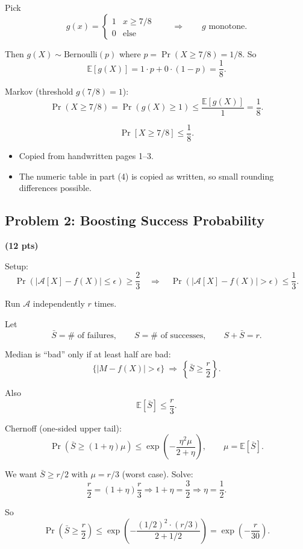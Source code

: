 \documentclass[10pt]{article}
\newcommand{\spara}[1]{\vspace{.5em}\noindent {\large\sffamily\textcolor{nyuOfficialPurple}{#1}}}
\newcommand{\E}{\mathbb{E}}
\begin{document}
\begin{enumerate}[label=\arabic*.]
Pick
\[
g(x)=
\begin{cases}
1 & x\ge 7/8\\
0 & \text{else}
\end{cases}
\qquad\Rightarrow\qquad
g \text{ monotone.}
\]

Then $g(X)\sim \text{Bernoulli}(p)$ where $p=\Pr(X\ge 7/8)=1/8$.
So
\[
\E[g(X)] = 1\cdot p + 0\cdot (1-p) = \frac{1}{8}.
\]

Markov (threshold $g(7/8)=1$):
\[
\Pr(X\ge 7/8)=\Pr(g(X)\ge 1)\le \frac{\E[g(X)]}{1}=\frac{1}{8}.
\]

\[
\boxed{\Pr[X\ge 7/8]\le \frac{1}{8}.}
\]

\spara{Notes for Problem 1}
\begin{itemize}
\item Copied from handwritten pages 1--3.
\item The numeric table in part (4) is copied as written, so small rounding differences possible.
\end{itemize}

\end{enumerate}



\subsection{Problem 2: Boosting Success Probability}
\textbf{(12 pts)}

\spara{Pr. 2}

Setup:
\[
\Pr(|\mathcal{A}[X]-f(X)|\le \epsilon)\ge \frac{2}{3}
\quad\Rightarrow\quad
\Pr(|\mathcal{A}[X]-f(X)|>\epsilon)\le \frac{1}{3}.
\]

Run $\mathcal{A}$ independently $r$ times.

Let
\[
\bar{S}=\#\text{ of failures},\qquad S=\#\text{ of successes},\qquad S+\bar{S}=r.
\]

Median is ``bad'' only if at least half are bad:
\[
\{|M-f(X)|>\epsilon\}\ \Rightarrow\ \left\{\bar{S}\ge \frac{r}{2}\right\}.
\]

Also
\[
\E[\bar{S}] \le \frac{r}{3}.
\]

Chernoff (one-sided upper tail):
\[
\Pr(\bar{S}\ge (1+\eta)\mu)\le \exp\!\left(-\frac{\eta^2\mu}{2+\eta}\right),
\qquad
\mu=\E[\bar{S}].
\]

We want $\bar{S}\ge r/2$ with $\mu=r/3$ (worst case). Solve:
\[
\frac{r}{2}=(1+\eta)\frac{r}{3}
\Rightarrow
1+\eta=\frac{3}{2}
\Rightarrow
\eta=\frac{1}{2}.
\]

So
\[
\Pr\!\left(\bar{S}\ge \frac{r}{2}\right)
\le
\exp\!\left(-\frac{(1/2)^2\cdot (r/3)}{2+1/2}\right)
=
\exp\!\left(-\frac{r}{30}\right).
\]
\end{document}
